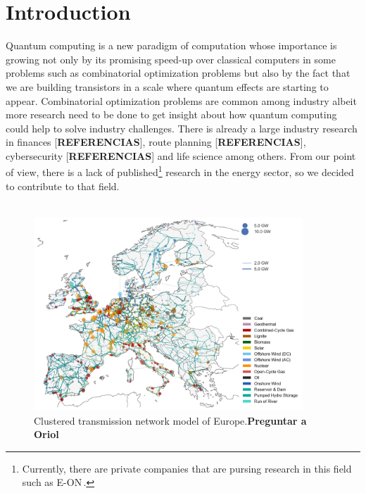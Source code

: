 
\chapter{Introduction} %

\label{Chapter1} %

%
%
Quantum computing is a new paradigm of computation whose importance is growing not only by its promising speed-up over classical computers in some problems such as combinatorial optimization problems but also by the fact that we are building transistors in a scale where quantum effects are starting to appear. Combinatorial optimization problems are common among industry albeit more research need to be done to get insight about how quantum computing could help to solve industry challenges. There is already a large industry research in finances [\textbf{REFERENCIAS}], route planning [\textbf{REFERENCIAS}], cybersecurity [\textbf{REFERENCIAS}] and life science among others. From our point of view, there is a lack of published\footnote{Currently, there are private companies that are pursing research in this field such as E-ON\,\cite{Fernandez-Campoamor2021CommunityAnnealing}.} research in the energy sector, so we decided to contribute to that field.\\\\
\begin{figure}[H]
  \begin{center}
\includegraphics[width=0.9\textwidth]{Figures/Europe-Grid.png}
  \end{center}
  \caption{Clustered transmission network model of Europe.\textbf{Preguntar a Oriol}}
\end{figure}
